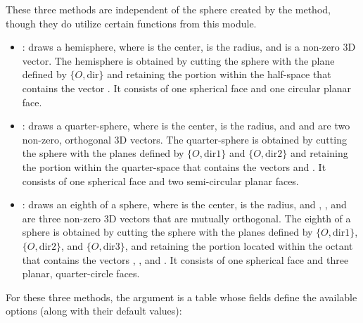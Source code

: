 These three methods are independent of the sphere created by the  method, though they do utilize certain functions from this module.

\begin{itemize}
    \item {}: draws a hemisphere, where  is the center,  is the radius, and  is a non-zero 3D vector. The hemisphere is obtained by cutting the sphere with the plane defined by $\{O, \mathrm{dir}\}$ and retaining the portion within the half-space that contains the vector . It consists of one spherical face and one circular planar face. 

    \item {}: draws a quarter-sphere, where  is the center,  is the radius, and  and  are two non-zero, orthogonal 3D vectors. The quarter-sphere is obtained by cutting the sphere with the planes defined by $\{O, \mathrm{dir1}\}$ and $\{O, \mathrm{dir2}\}$ and retaining the portion within the quarter-space that contains the vectors  and . It consists of one spherical face and two semi-circular planar faces.

    \item {}: draws an eighth of a sphere, where  is the center,  is the radius, and , , and  are three non-zero 3D vectors that are mutually orthogonal. The eighth of a sphere is obtained by cutting the sphere with the planes defined by $\{O,\mathrm{dir1}\}$, $\{O,\mathrm{dir2}\}$, and $\{O,\mathrm{dir3}\}$, and retaining the portion located within the octant that contains the vectors , , and . It consists of one spherical face and three planar, quarter-circle faces.
\end{itemize}

For these three methods, the  argument is a table whose fields define the available options (along with their default values):

